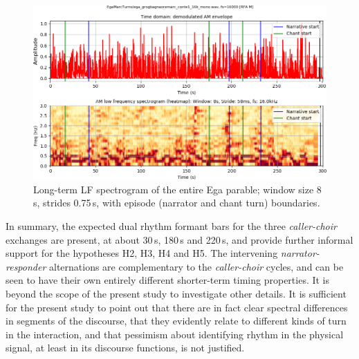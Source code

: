 \documentclass[output=paper,colorlinks,citecolor=brown]{langscibook}
\begin{document}
\begin{figure}
\includegraphics[width=\textwidth]{gibbon_figure08.png}
\caption{\label{fig:fig08}Long-term LF spectrogram of the entire Ega parable; window size 8\,s, strides 0.75\,s, with episode (narrator and chant turn) boundaries.}
\end{figure}

In summary,\largerpage{} the expected dual rhythm formant bars for the three \textit{caller-choir} exchanges are present, at about 30\,s, 180\,s and 220\,s, and provide further informal support for the hypotheses H2, H3, H4 and H5. The intervening \textit{narrator-responder} alternations are complementary to the \textit{caller-choir} cycles, and can be seen to have their own entirely different shorter-term timing properties. It is beyond the scope of the present study to investigate other details. It is sufficient for the present study to point out that there are in fact clear spectral differences in segments of the discourse, that they evidently relate to different kinds of turn in the interaction, and that pessimism about identifying rhythm in the physical signal, at least in its discourse functions, is not justified.
\end{document}
